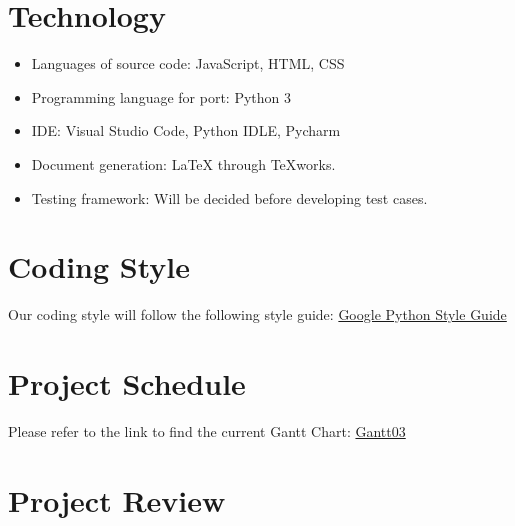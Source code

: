 \documentclass{article}
\begin{document}
\section{Technology}
\begin{itemize}
\item Languages of source code: JavaScript, HTML, CSS
\item Programming language for port: Python 3
\item IDE: Visual Studio Code, Python IDLE, Pycharm
\item Document generation: LaTeX through TeXworks.
\item Testing framework: Will be  decided before developing test cases.

\end{itemize}
\section{Coding Style}
Our coding style will follow the following style guide:\color{blue} 
\href{https://google.github.io/styleguide/pyguide.html}{ Google Python Style Guide} 

\color{black}
\section{Project Schedule}

Please refer to the link to find the current Gantt Chart:
\color{blue}
\href{https://gitlab.cas.mcmaster.ca/liangw15/3XA3Project/blob/master/Doc/DevelopmentPlan/Group12_Gantt03.pdf}{ Gantt03}
\color{black}

\section{Project Review}
\end{document}
